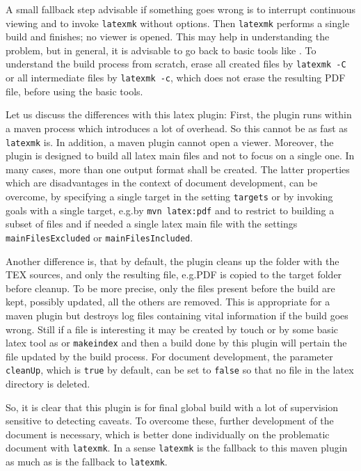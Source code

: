A small fallback step advisable if something goes wrong 
is to interrupt continuous viewing and to invoke \texttt{latexmk} without options. 
Then \texttt{latexmk} performs a single build and finishes; no viewer is opened. 
This may help in understanding the problem, 
but in general, it is advisable to go back to basic tools like \lualatex. 
To understand the build process from scratch, 
erase all created files by \texttt{latexmk -C} 
or all intermediate files by \texttt{latexmk -c}, which does not erase the resulting PDF file, 
before using the basic tools. 
\medskip



Let us discuss the differences with this latex plugin: 
First, the plugin runs within a maven process which introduces a lot of overhead. 
So this cannot be as fast as \texttt{latexmk} is. 
In addition, a maven plugin cannot open a viewer. 
Moreover, the plugin is designed to build all latex main files 
and not to focus on a single one. 
In many cases, more than one output format shall be created. 
The latter properties which are disadvantages in the context of document development, 
can be overcome, by specifying a single target in the setting \texttt{targets} 
or by invoking goals with a single target, e.g.\@ by \texttt{mvn latex:pdf} 
and to restrict to building a subset of files and if needed a single latex main file
with the settings \texttt{mainFilesExcluded} or \texttt{mainFilesIncluded}. 

Another difference is, that by default, the plugin cleans up the folder with the TEX sources, 
and only the resulting file, e.g.\@ PDF is copied to the target folder before cleanup. 
To be more precise, only the files present before the build are kept, possibly updated, 
all the others are removed. 
This is appropriate for a maven plugin but destroys log files containing vital information 
if the build goes wrong. 
Still if a file is interesting it may be created by touch or by some basic latex tool 
as \lualatex{} or \texttt{makeindex} 
and then a build done by this plugin will pertain the file updated by the build process. 
For document development, 
the parameter \texttt{cleanUp}, which is \texttt{true} by default, 
can be set to \texttt{false} 
so that no file in the latex directory is deleted. 

So, it is clear that this plugin is for final global build with a lot of supervision 
sensitive to detecting caveats. 
To overcome these, further development of the document is necessary, 
which is better done individually on the problematic document with \texttt{latexmk}. 
In a sense \texttt{latexmk} is the fallback to this maven plugin 
as much as \lualatex{} is the fallback to \texttt{latexmk}. 

